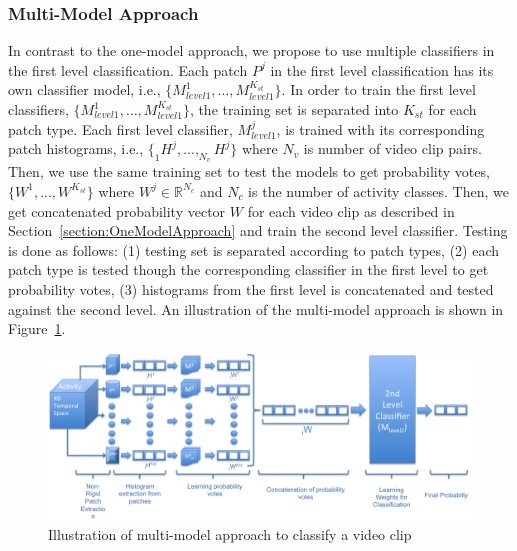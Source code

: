 \subsubsection{Multi-Model Approach}
\label{section:MultiModelApproach}
In contrast to the one-model approach, we propose to use multiple classifiers in the first level classification. Each patch $P^{j}$ in the first level classification has its own classifier model, i.e., $\{M_{level1}^{1},\dots,M_{level1}^{K_{st}}\}$. In order to train the first level classifiers, $\{M_{level1}^{1},\dots,M_{level1}^{K_{st}}\}$, the training set is separated into $K_{st}$ for each patch type. Each first level classifier, $M_{level1}^{j}$, is trained with its corresponding patch histograms, i.e., $\{_{1}H^{j},...,_{N_{v}}H^{j}\}$ where $N_{v}$ is number of video clip pairs. Then, we use the same training set to test the models to get probability votes, $\{W^{1},...,W^{K_{st}}\}$ where $W^{j} \in \mathbb{R}^{N_{c}}$ and $N_{c}$ is the number of activity classes. Then, we get concatenated probability vector $W$ for each video clip as described in Section~\ref{section:OneModelApproach} and train the second level classifier. Testing is done as follows: (1) testing set is separated according to patch types, (2) each patch type is tested though the corresponding classifier in the first level to get probability votes, (3) histograms from the first level is concatenated and tested against the second level. An illustration of the multi-model approach is shown in Figure~\ref{fig:multiModelApproachIllustration}.
    
    
\begin{figure}[!htbp]
\begin{center}
\includegraphics[scale=0.5]{Figures/multiModelApproach3}
\end{center}
\caption{Illustration of multi-model approach to classify a video clip \label{fig:multiModelApproachIllustration}}
\end{figure}





























